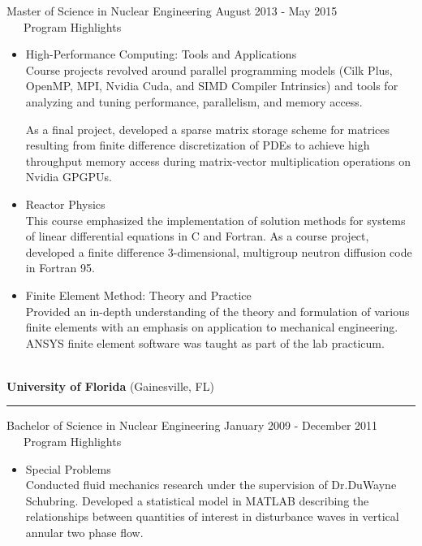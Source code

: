 \documentclass[legalpaper]{article}
\begin{document}
Master of Science in Nuclear Engineering \hfill August 2013 - May 2015\\
\vspace{\baselineskip} %
~~~Program Highlights
\begin{itemize}[topsep=0pt, before={\vspace*{-0.5\baselineskip}}]%
\item High-Performance Computing: Tools and Applications\\
  Course projects revolved around parallel programming models (Cilk Plus, OpenMP, MPI, Nvidia Cuda, and SIMD Compiler Intrinsics) and tools for analyzing and tuning performance, parallelism, and memory access.

  As a final project, developed a sparse matrix storage scheme for matrices resulting from finite difference discretization of PDEs to achieve high throughput memory access during matrix-vector multiplication operations on Nvidia GPGPUs.

\item Reactor Physics\\
  This course emphasized the implementation of solution methods for systems of linear differential equations in C and Fortran.
  As a course project, developed a finite difference 3-dimensional, multigroup neutron diffusion code in Fortran 95.

\item Finite Element Method: Theory and Practice\\
  Provided an in-depth understanding of the theory and formulation of various finite elements with an emphasis on application to mechanical engineering.
  ANSYS finite element software was taught as part of the lab practicum.

\end{itemize}
~\\
\textbf{University of Florida} (Gainesville, FL) \hrule \vspace{1mm}
Bachelor of Science in Nuclear Engineering \hfill January 2009 - December 2011\\
\vspace{\baselineskip} %
~~~Program Highlights
\begin{itemize}[topsep=0pt, before={\vspace*{-0.5\baselineskip}}]%
\item Special Problems\\
  Conducted fluid mechanics research under the supervision of Dr.\@ DuWayne Schubring.
  Developed a statistical model in MATLAB describing the relationships between quantities of interest in disturbance waves in vertical annular two phase flow.
\end{itemize}
\end{document}
